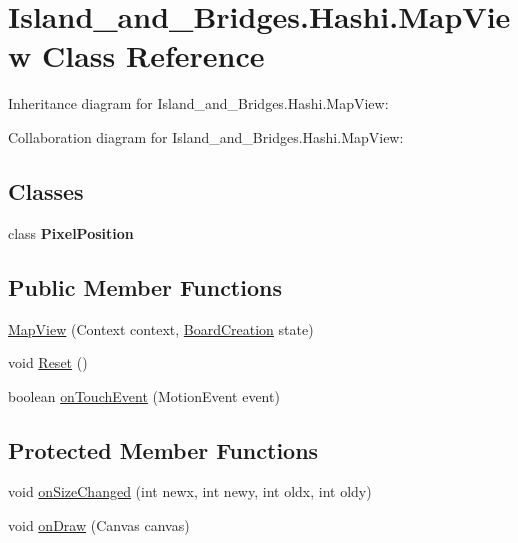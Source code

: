 \hypertarget{class_island__and___bridges_1_1_hashi_1_1_map_view}{}\section{Island\+\_\+and\+\_\+\+Bridges.\+Hashi.\+Map\+View Class Reference}
\label{class_island__and___bridges_1_1_hashi_1_1_map_view}


Inheritance diagram for Island\+\_\+and\+\_\+\+Bridges.\+Hashi.\+Map\+View\+:


Collaboration diagram for Island\+\_\+and\+\_\+\+Bridges.\+Hashi.\+Map\+View\+:
\subsection*{Classes}
\begin{DoxyCompactItemize}
\item 
class {\bfseries Pixel\+Position}
\end{DoxyCompactItemize}
\subsection*{Public Member Functions}
\begin{DoxyCompactItemize}
\item 
\mbox{\hyperlink{class_island__and___bridges_1_1_hashi_1_1_map_view_a3dd9d46bb976ddf992959ce4b2ea70eb}{Map\+View}} (Context context, \mbox{\hyperlink{class_island__and___bridges_1_1_hashi_1_1_board_creation}{Board\+Creation}} state)
\item 
void \mbox{\hyperlink{class_island__and___bridges_1_1_hashi_1_1_map_view_a8a8dea4f3a9f81e4c2c68426ab5a0fda}{Reset}} ()
\item 
boolean \mbox{\hyperlink{class_island__and___bridges_1_1_hashi_1_1_map_view_a594e4eda45768924edc668184aa73904}{on\+Touch\+Event}} (Motion\+Event event)
\end{DoxyCompactItemize}
\subsection*{Protected Member Functions}
\begin{DoxyCompactItemize}
\item 
void \mbox{\hyperlink{class_island__and___bridges_1_1_hashi_1_1_map_view_af463b4f0ab8ec352fe8b45c1fd0c86e9}{on\+Size\+Changed}} (int newx, int newy, int oldx, int oldy)
\item 
void \mbox{\hyperlink{class_island__and___bridges_1_1_hashi_1_1_map_view_aa26cf8ba4b29beda814c99a823f4b609}{on\+Draw}} (Canvas canvas)
\end{DoxyCompactItemize}


